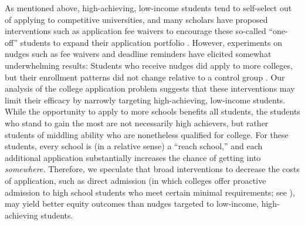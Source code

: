 As mentioned above, high-achieving, low-income students tend to self-select out of applying to competitive universities, and many scholars have proposed interventions such as application fee waivers to encourage these so-called  ``one-off'' students to expand their application portfolio \citep{hoxbyandavery2012,hoxbyandturner2013}. However, experiments on nudges such as fee waivers and deadline reminders have elicited somewhat underwhelming results: Students who receive nudges did apply to more colleges, but their enrollment patterns did not change relative to a control group \citep{gurantzetal2021}. Our analysis of the college application problem suggests that these interventions may limit their efficacy by narrowly targeting high-achieving, low-income students. While the opportunity to apply to more schools benefits all students, the students who stand to gain the most are not necessarily high achievers, but rather students of middling ability who are nonetheless qualified for college. For these students, every school is (in a relative sense) a ``reach school,'' and each additional application substantially increases the chance of getting into \emph{somewhere.} Therefore, we speculate that broad interventions to decrease the costs of application, such as direct admission (in which colleges offer proactive admission to high school students who meet certain minimal requirements; see \citealt{jaschik2022}), may yield better equity outcomes than nudges targeted to low-income, high-achieving students.





